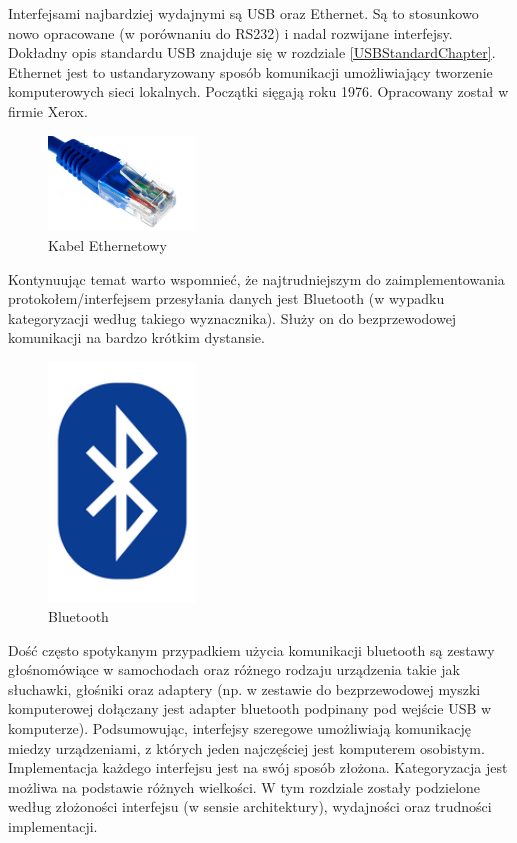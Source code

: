\documentclass{BscUS}
\begin{document}
\indent Interfejsami najbardziej wydajnymi są USB oraz Ethernet. Są to stosunkowo nowo opracowane (w porównaniu do RS232) i nadal rozwijane interfejsy. Dokładny opis standardu USB znajduje się w rozdziale \ref{USBStandardChapter}. Ethernet jest to ustandaryzowany sposób komunikacji umożliwiający tworzenie komputerowych sieci lokalnych. Początki sięgają roku 1976. Opracowany został w firmie Xerox.
\begin{figure}[H]
\centering
\includegraphics[width=0.35\textwidth]{./img/ethernet-cable}
\caption{Kabel Ethernetowy \cite{ethernetCable}}
\label{fig:EthernetCable}
\end{figure}
Kontynuując temat warto wspomnieć, że najtrudniejszym do zaimplementowania protokołem/interfejsem przesyłania danych jest Bluetooth (w wypadku kategoryzacji według takiego wyznacznika). Służy on do bezprzewodowej komunikacji na bardzo krótkim dystansie.
\begin{figure}[H]
\centering
\includegraphics[width=0.35\textwidth]{./img/bluetooth-logo}
\caption{Bluetooth \cite{bluetooth}}
\label{fig:blueTooth}
\end{figure}
\noindent Dość często spotykanym przypadkiem użycia komunikacji bluetooth są zestawy głośnomówiące w samochodach oraz różnego rodzaju urządzenia takie jak słuchawki, głośniki oraz adaptery (np. w zestawie do bezprzewodowej myszki komputerowej dołączany jest adapter bluetooth podpinany pod wejście USB w komputerze).
\newline
\indent Podsumowując, interfejsy szeregowe umożliwiają komunikację miedzy urządzeniami, z których jeden najczęściej jest komputerem osobistym. Implementacja każdego interfejsu jest na swój sposób złożona. Kategoryzacja jest możliwa na podstawie różnych wielkości. W tym rozdziale zostały podzielone według złożoności interfejsu (w sensie architektury), wydajności oraz trudności implementacji.
\end{document}
